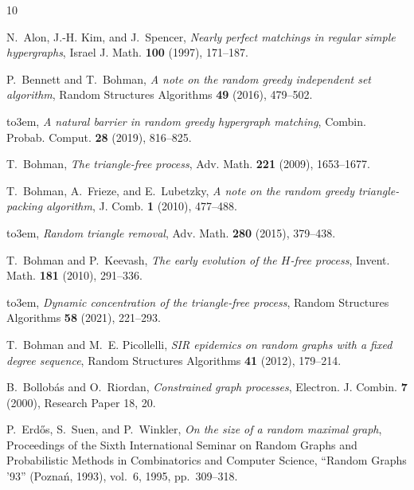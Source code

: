 \documentclass[11pt]{amsart}
\theoremstyle{definition}
\numberwithin{equation}{section}
\begin{document}
	
\providecommand{\bysame}{\leavevmode\hbox to3em{\hrulefill}\thinspace}
\providecommand{\MR}{\relax\ifhmode\unskip\space\fi MR }
\providecommand{\MRhref}[2]{%
  \href{http://www.ams.org/mathscinet-getitem?mr=#1}{#2}
}
\providecommand{\href}[2]{#2}
\begin{thebibliography}{10}

N.~Alon, J.-H. Kim, and J.~Spencer, \emph{Nearly perfect matchings in regular simple hypergraphs}, Israel J. Math. \textbf{100} (1997), 171--187.

P.~Bennett and T.~Bohman, \emph{A note on the random greedy independent set algorithm}, Random Structures Algorithms \textbf{49} (2016), 479--502.

\bysame, \emph{A natural barrier in random greedy hypergraph matching}, Combin. Probab. Comput. \textbf{28} (2019), 816–825.

T.~Bohman, \emph{The triangle-free process}, Adv. Math. \textbf{221} (2009), 1653--1677.

T.~Bohman, A.~Frieze, and E.~Lubetzky, \emph{A note on the random greedy triangle-packing algorithm}, J. Comb. \textbf{1} (2010), 477--488.

\bysame, \emph{Random triangle removal}, Adv. Math. \textbf{280} (2015), 379--438.

T.~Bohman and P.~Keevash, \emph{The early evolution of the {$H$}-free process}, Invent. Math. \textbf{181} (2010), 291--336.

\bysame, \emph{Dynamic concentration of the triangle-free process}, Random Structures Algorithms \textbf{58} (2021), 221--293.

T.~Bohman and M.~E. Picollelli, \emph{S{IR} epidemics on random graphs with a fixed degree sequence}, Random Structures Algorithms \textbf{41} (2012), 179--214.

B.~Bollob\'{a}s and O.~Riordan, \emph{Constrained graph processes}, Electron. J. Combin. \textbf{7} (2000), Research Paper 18, 20.

P.~Erd\H{o}s, S.~Suen, and P.~Winkler, \emph{On the size of a random maximal graph}, Proceedings of the {S}ixth {I}nternational {S}eminar on {R}andom {G}raphs and {P}robabilistic {M}ethods in {C}ombinatorics and {C}omputer {S}cience, ``{R}andom {G}raphs '93'' ({P}ozna\'{n}, 1993), vol.~6, 1995, pp.~309--318.


\end{thebibliography}
\end{document}
